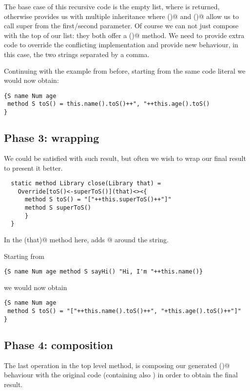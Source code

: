 The base case of this recursive code is the empty list, where \Q@acc@ is returned,
otherwise \Q@Override@ provides us with multiple inheritance where
()@ and ()@
allow us to call super from the first/second parameter.
Of course we can not just compose \Q@acc@ with the top of our list: they both offer
a \Q@toS()@ method. We need to provide extra code to override the conflicting implementation
and provide new behaviour, in this case, the two strings separated by a comma.

Continuing with the example from before, starting from the same code literal we would now obtain:

\begin{lstlisting}
{S name Num age
 method S toS() = this.name().toS()++", "++this.age().toS()
}
\end{lstlisting}

\subsection*{Phase 3: wrapping}
We could be satisfied with such result, but often we wish to wrap our final result
to present it better.

\begin{lstlisting}
  static method Library close(Library that) =
    Override[toS()<-superToS()](that)<><{
      method S toS() = "["++this.superToS()++"]"
      method S superToS()
      }
  }
\end{lstlisting}

  In the \Q@close(that)@ method here, \Q@Override@ adds \Q@[]@ around the string.

Starting from

\begin{lstlisting}
{S name Num age method S sayHi() "Hi, I'm "++this.name()}
\end{lstlisting}

we would now obtain

\begin{lstlisting}
{S name Num age
 method S toS() = "["++this.name().toS()++", "+this.age().toS()++"]"
}
\end{lstlisting}

\subsection*{Phase 4: composition}
The last operation in the top level method, is composing our generated \Q@toS()@ behaviour with the
original code (containing also \Q@sayHi@) in order to obtain the final result.

